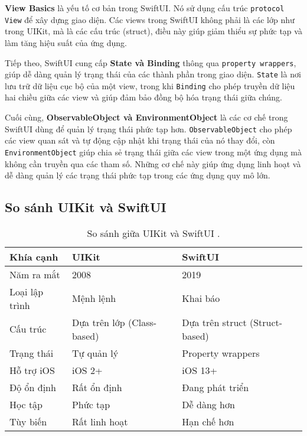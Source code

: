 \vspace{0.5em}

\textbf{View Basics} là yếu tố cơ bản trong SwiftUI. Nó sử dụng cấu trúc \texttt{protocol View} để xây dựng giao diện. Các views trong SwiftUI không phải là các lớp như trong UIKit, mà là các cấu trúc (struct), điều này giúp giảm thiểu sự phức tạp và làm tăng hiệu suất của ứng dụng.

\vspace{0.5em}

Tiếp theo, SwiftUI cung cấp \textbf{State và Binding} thông qua \texttt{property wrappers}, giúp dễ dàng quản lý trạng thái của các thành phần trong giao diện. \texttt{State} là nơi lưu trữ dữ liệu cục bộ của một view, trong khi \texttt{Binding} cho phép truyền dữ liệu hai chiều giữa các view và giúp đảm bảo đồng bộ hóa trạng thái giữa chúng.

\vspace{0.5em}

Cuối cùng, \textbf{ObservableObject và EnvironmentObject} \cite{ObservableObject} là các cơ chế trong SwiftUI dùng để quản lý trạng thái phức tạp hơn. \texttt{ObservableObject} cho phép các view quan sát và tự động cập nhật khi trạng thái của nó thay đổi, còn \texttt{EnvironmentObject} giúp chia sẻ trạng thái giữa các view trong một ứng dụng mà không cần truyền qua các tham số. Những cơ chế này giúp ứng dụng linh hoạt và dễ dàng quản lý các trạng thái phức tạp trong các ứng dụng quy mô lớn.

\subsection{So sánh UIKit và SwiftUI}

\begin{table}[H] %
\centering
\begin{tabular}{|l|l|l|}
\hline
\textbf{Khía cạnh} & \textbf{UIKit} & \textbf{SwiftUI} \\
\hline
Năm ra mắt & 2008 & 2019 \\
\hline
Loại lập trình & Mệnh lệnh & Khai báo \\
\hline
Cấu trúc & Dựa trên lớp (Class-based) & Dựa trên struct (Struct-based) \\
\hline
Trạng thái & Tự quản lý & Property wrappers \\
\hline
Hỗ trợ iOS & iOS 2+ & iOS 13+ \\
\hline
Độ ổn định & Rất ổn định & Đang phát triển \\
\hline
Học tập & Phức tạp & Dễ dàng hơn \\
\hline
Tùy biến & Rất linh hoạt & Hạn chế hơn \\
\hline
\end{tabular}
\caption{So sánh giữa UIKit và SwiftUI \cite{UIKit_SwiftUI}.}
\end{table}
